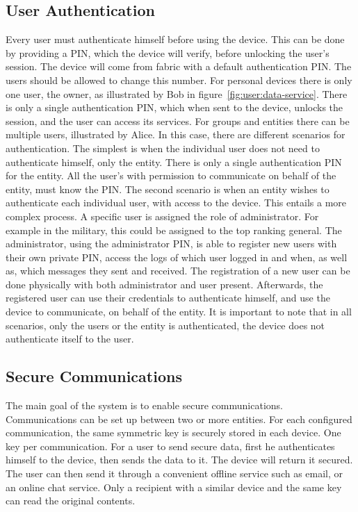 \subsection{User Authentication}\label{chap:problem:scenarios:auth}

Every user must authenticate himself before using the device. This can be done by providing a PIN, which the device will verify, before unlocking the user's session.
The device will come from fabric with a default authentication PIN. The users should be allowed to change this number.
For personal devices there is only one user, the owner, as illustrated by Bob in figure~\ref{fig:user:data-service}. There is only a single authentication PIN, which when sent to the device, unlocks the session, and the user can access its services.
For groups and entities there can be multiple users, illustrated by Alice. In this case, there are different scenarios for authentication.
The simplest is when the individual user does not need to authenticate himself, only the entity. There is only a single authentication PIN for the entity. All the user's with permission to communicate on behalf of the entity, must know the PIN.
The second scenario is when an entity wishes to authenticate each individual user, with access to the device. 
This entails a more complex process. A specific user is assigned the role of administrator. For example in the military, this could be assigned to the top ranking general. The administrator, using the administrator PIN, is able to register new users with their own private PIN, access the logs of which user logged in and when, as well as, which messages they sent and received.
The registration of a new user can be done physically with both administrator and user present. Afterwards, the registered user can use their credentials to authenticate himself, and use the device to communicate, on behalf of the entity.
It is important to note that in all scenarios, only the users or the entity is authenticated, the device does not authenticate itself to the user.

\subsection{Secure Communications}\label{chap:problem:scenarios:comms}

The main goal of the system is to enable secure communications. Communications can be set up between two or more entities. For each configured communication, the same symmetric key is securely stored in each device. One key per communication.
For a user to send secure data, first he authenticates himself to the device, then sends the data to it. The device will return it secured. The user can then send it through a convenient offline service such as email, or an online chat service. Only a recipient with a similar device and the same key can read the original contents.

